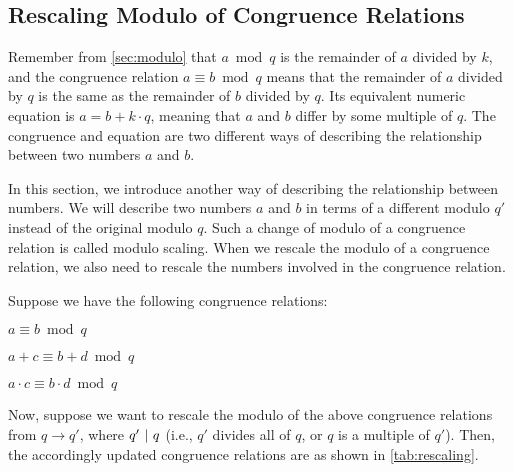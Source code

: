 
\subsection{Rescaling Modulo of Congruence Relations}
\label{subsec:modulo-rescaling}

Remember from \autoref{sec:modulo} that $a \bmod q$ is the remainder of $a$ divided by $k$, and the congruence relation $a \equiv b \bmod q$ means that the remainder of $a$ divided by $q$ is the same as the remainder of $b$ divided by $q$. Its equivalent numeric equation is  $a = b + k\cdot q$, meaning that $a$ and $b$ differ by some multiple of $q$. The congruence and equation are two different ways of describing the relationship between two numbers $a$ and $b$. 

In this section, we introduce another way of describing the relationship between numbers. We will describe two numbers $a$ and $b$ in terms of a different modulo $q'$ instead of the original modulo $q$. Such a change of modulo of a congruence relation is called modulo scaling. When we rescale the modulo of a congruence relation, we also need to rescale the numbers involved in the congruence relation. 

Suppose we have the following congruence relations: 

$a \equiv b \bmod q$

$a + c \equiv b + d\bmod q$

$a \cdot c \equiv b \cdot d\bmod q$

Now, suppose we want to rescale the modulo of the above congruence relations from $q \rightarrow q'$, where $q' \text{ } \text{$|$} \text{ } q$ (i.e., $q'$ divides all of $q$, or $q$ is a multiple of $q'$). Then, the accordingly updated congruence relations are as shown in \autoref{tab:rescaling}.



